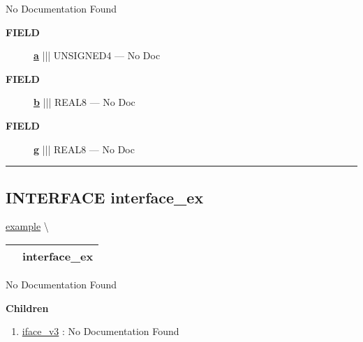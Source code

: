 \par





No Documentation Found







\par
\begin{description}
\item [\colorbox{tagtype}{\color{white} \textbf{\textsf{FIELD}}}] \textbf{\underline{a}} ||| UNSIGNED4 --- No Doc
\item [\colorbox{tagtype}{\color{white} \textbf{\textsf{FIELD}}}] \textbf{\underline{b}} ||| REAL8 --- No Doc
\item [\colorbox{tagtype}{\color{white} \textbf{\textsf{FIELD}}}] \textbf{\underline{g}} ||| REAL8 --- No Doc
\end{description}





\rule{\linewidth}{0.5pt}
\subsection*{\textsf{\colorbox{headtoc}{\color{white} INTERFACE}
interface\_ex}}

\hypertarget{ecldoc:example.interface_ex}{}
\hspace{0pt} \hyperlink{ecldoc:example}{example} \textbackslash 

{\renewcommand{\arraystretch}{1.5}
\begin{tabularx}{\textwidth}{|>{\raggedright\arraybackslash}l|X|}
\hline
\hspace{0pt}\mytexttt{\color{red} } & \textbf{interface\_ex} \\
\hline
\end{tabularx}
}

\par





No Documentation Found







\textbf{Children}
\begin{enumerate}
\item \hyperlink{ecldoc:example.interface_ex.iface_v3}{iface\_v3}
: No Documentation Found
\end{enumerate}

